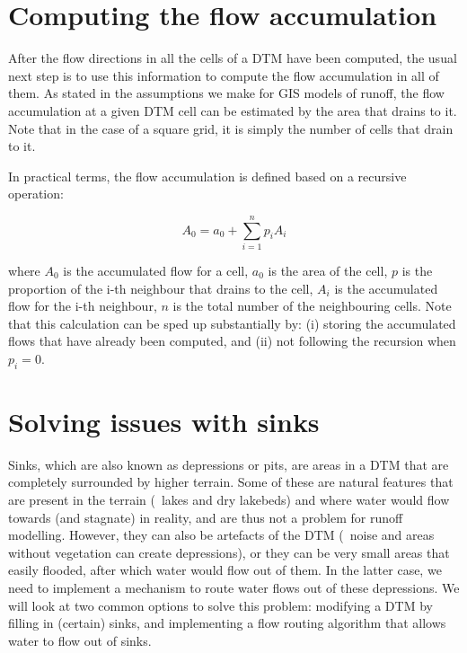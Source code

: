 \section[Computing flow accumulation]{Computing the flow accumulation}%
\label{se:accumulation}

After the flow directions in all the cells of a DTM have been computed, the usual next step is to use this information to compute the flow accumulation in all of them.
As stated in the assumptions we make for GIS models of runoff, the flow accumulation at a given DTM cell can be estimated by the area that drains to it.
Note that in the case of a square grid, it is simply the number of cells that drain to it.

In practical terms, the flow accumulation is defined based on a recursive operation:

\begin{equation}
A_0 = a_0 + \sum_{i=1}^{n} p_i A_i
\end{equation}

where \(A_0\) is the accumulated flow for a cell, \(a_0\) is the area of the cell, \(p\) is the proportion of the i-th neighbour that drains to the cell, \(A_i\) is the accumulated flow for the i-th neighbour, \(n\) is the total number of the neighbouring cells.
Note that this calculation can be sped up substantially by: (i) storing the accumulated flows that have already been computed, and (ii) not following the recursion when \(p_i = 0\).

\section{Solving issues with sinks}

Sinks, which are also known as depressions or pits, are areas in a DTM that are completely surrounded by higher terrain.
Some of these are natural features that are present in the terrain (\eg\ lakes and dry lakebeds) and where water would flow towards (and stagnate) in reality, and are thus not a problem for runoff modelling.
However, they can also be artefacts of the DTM (\eg\ noise and areas without vegetation can create depressions), or they can be very small areas that easily flooded, after which water would flow out of them.
In the latter case, we need to implement a mechanism to route water flows out of these depressions.
We will look at two common options to solve this problem: modifying a DTM by filling in (certain) sinks, and implementing a flow routing algorithm that allows water to flow out of sinks.

